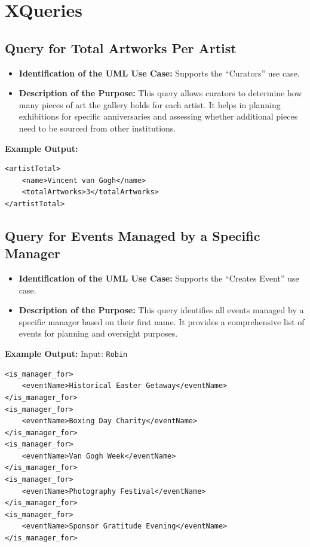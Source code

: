 \documentclass{article} %
\begin{document}
\newpage
\section{XQueries}
\subsection{Query for Total Artworks Per Artist}
\begin{itemize}
    \item \textbf{Identification of the UML Use Case:} Supports the ``Curators'' use case.
    \item \textbf{Description of the Purpose:} This query allows curators to determine how many pieces of art the gallery holds for each artist. It helps in planning exhibitions for specific anniversaries and assessing whether additional pieces need to be sourced from other institutions.
\end{itemize}

\textbf{Example Output:}
\begin{verbatim}
<artistTotal>
    <name>Vincent van Gogh</name>
    <totalArtworks>3</totalArtworks>
</artistTotal>
\end{verbatim}

\subsection{Query for Events Managed by a Specific Manager}
\begin{itemize}
    \item \textbf{Identification of the UML Use Case:} Supports the ``Creates Event'' use case.
    \item \textbf{Description of the Purpose:} This query identifies all events managed by a specific manager based on their first name. It provides a comprehensive list of events for planning and oversight purposes.
\end{itemize}

\textbf{Example Output:}  
Input: \texttt{Robin}
\begin{verbatim}
<is_manager_for>
    <eventName>Historical Easter Getaway</eventName>
</is_manager_for>
<is_manager_for>
    <eventName>Boxing Day Charity</eventName>
</is_manager_for>
<is_manager_for>
    <eventName>Van Gogh Week</eventName>
</is_manager_for>
<is_manager_for>
    <eventName>Photography Festival</eventName>
</is_manager_for>
<is_manager_for>
    <eventName>Sponsor Gratitude Evening</eventName>
</is_manager_for>
\end{verbatim}
\end{document}
